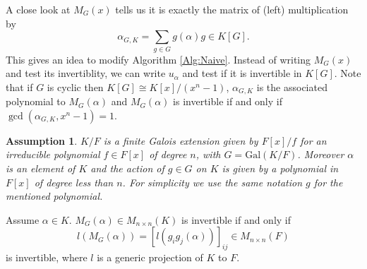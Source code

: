 \documentclass[sigconf]{acmart}
\newcommand{\osum}[2]{\alpha_{#1,#2}}
\theoremstyle{acmplain}
\newtheorem{assumption}{Assumption}
\begin{document}
 A close look at $M_G(x)$ tells us it is exactly the matrix of (left) multiplication by $$\alpha_{G,K} = \sum_{g \in G} g(\alpha)g \in K[G].$$  This gives an idea to modify Algorithm \ref{Alg:Naive}. Instead of writing $M_G(x)$ and test its invertiblity, 
 we can write $u_\alpha$ and test if it is invertible in $K[G]$. Note that if $G$ is cyclic then $K[G] \cong K[x]/(x^n-1)$,
 $\osum{G}{K}$ is the associated polynomial to $M_G(\alpha)$ and $M_G(\alpha)$ is invertible if and only if 
 $\gcd (\osum{G}{K},x^n-1) = 1 $.
 
\begin{assumption}\label{assum}
$K/F$ is a finite Galois extension given by $ F[x]/f$ for an irreducible polynomial $f\in F[x]$ of degree $n$, with
 $G = \mathrm{Gal}(K/F)$. Moreover $\alpha$ is an element of $K$ and the action of $g \in G$ on $K$ is given by a
 polynomial in $F[x]$ of degree less than $n$. For simplicity we use the same notation $g$ for the mentioned 
 polynomial.
\end{assumption}

\begin{lemma}\label{Lem:Proj}
Assume $\alpha \in K$. $M_G(\alpha) \in M_{n \times n}(K)$ 
is invertible if and only if $$l(M_G(\alpha)) =  [l(g_ig_j(\alpha))]_{ij}  \in M_{n \times n}(F)$$ is invertible,
 where $l$ is a generic projection of $K$ to $F$.
\end{lemma}
\end{document}
